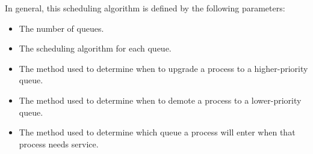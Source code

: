 In general, this scheduling algorithm is defined by the following parameters:
\begin{itemize}[noitemsep]
\item The number of queues.
\item The scheduling algorithm for each queue.
\item The method used to determine when to upgrade a process to a higher-priority queue.
\item The method used to determine when to demote a process to a lower-priority queue.
\item The method used to determine which queue a process will enter when that process needs service.
\end{itemize}

